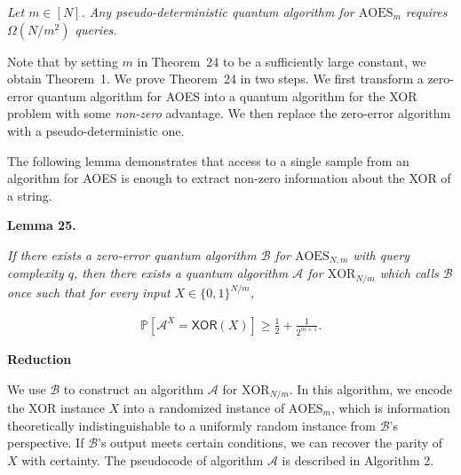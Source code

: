 \emph{Let $m\in[N]$. Any pseudo-deterministic quantum algorithm for ${\text{AOES}}_{m}$ requires $\Omega(N/m^{2})$ queries.}\par






Note that by setting $m$ in Theorem 24 to be a sufficiently large constant, we obtain Theorem 1.
We prove Theorem 24 in two steps. We first transform a zero-error quantum algorithm for AOES into a quantum algorithm for the XOR problem with some \emph{non-zero} advantage. We then replace the zero-error algorithm with a pseudo-deterministic one.\par




The following lemma demonstrates that access to a single sample from an algorithm for AOES is enough to extract non-zero information about the XOR of a string.\par





\par\medskip\noindent\textbf{
\textbf{Lemma 25}\textbf{.}
}\par



\emph{If there exists a zero-error quantum algorithm $\mathcal{B}$ for ${\text{AOES}}_{N,m}$ with query complexity $q$, then there exists a quantum algorithm $\mathcal{A}$ for ${\text{XOR}}_{N/m}$ which calls $\mathcal{B}$ once such that for every input $X\in\{0,1\}^{N/m}$,}\par


\[\begin{gathered}
\mathbb{P}\left[\mathcal{A}^{X}=\mathsf{XOR}(X)\right]\geq\frac{1}{2}+\frac{1}{2^{m+1}}.
\end{gathered}\]







\par\medskip\noindent\textbf{Reduction}\par




We use $\mathcal{B}$ to construct an algorithm $\mathcal{A}$ for ${\text{XOR}}_{N/m}$. In this algorithm, we encode the XOR instance $X$ into a randomized instance of ${\text{AOES}}_{m}$, which is information theoretically indistinguishable to a uniformly random instance from $\mathcal{B}$’s perspective. If $\mathcal{B}$’s output meets certain conditions, we can recover the parity of $X$ with certainty.
The pseudocode of algorithm $\mathcal{A}$ is described in Algorithm 2.\par



